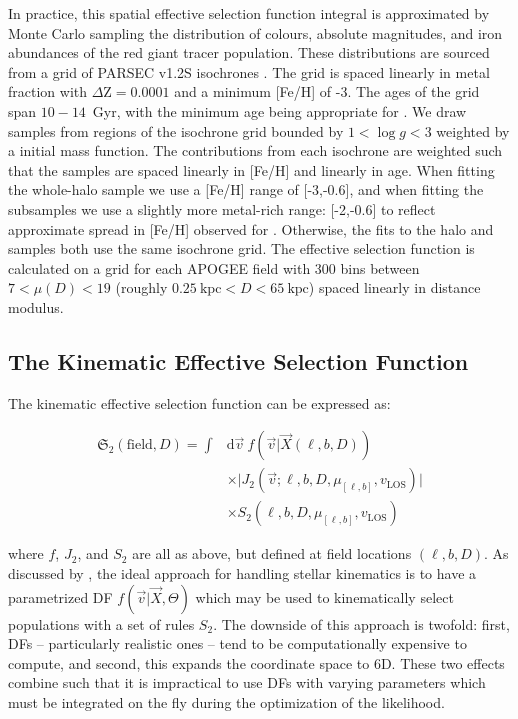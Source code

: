 In practice, this spatial effective selection function integral is approximated by Monte Carlo sampling the distribution of colours, absolute magnitudes, and iron abundances of the red giant tracer population. These distributions are sourced from a grid of PARSEC v1.2S isochrones \parencite{bressan12}. The grid is spaced linearly in metal fraction with $\Delta \mathrm{Z} = 0.0001$ and a minimum [Fe/H] of -3. The ages of the grid span $10-14$~Gyr, with the minimum age being appropriate for \gse \parencite{montalban21}. We draw samples from regions of the isochrone grid bounded by $1 < \log g < 3$ weighted by a \textcite{chabrier03} initial mass function. The contributions from each isochrone are weighted such that the samples are spaced linearly in [Fe/H] and linearly in age. When fitting the whole-halo sample we use a [Fe/H] range of [-3,-0.6], and when fitting the \gse subsamples we use a slightly more metal-rich range: [-2,-0.6] to reflect approximate spread in [Fe/H] observed for \gse \parencite[see our Figure~\ref{fig:selection_abundances} or refer to e.g.][]{myeong19,hasselquist21,horta23a}. Otherwise, the fits to the halo and \gse samples both use the same isochrone grid. The effective selection function is calculated on a grid for each APOGEE field with 300 bins between $7 < \mu(D) < 19$ (roughly $0.25~\mathrm{kpc} < D < 65~\mathrm{kpc}$) spaced linearly in distance modulus.

\subsection{The Kinematic Effective Selection Function}
\label{subsec:kinematic-effective-selection-function}

The kinematic effective selection function can be expressed as:

\begin{equation}
\label{eq:kinematic-effective-selection-function}
\begin{split}
    \mathfrak{S}_{2}(\mathrm{field},D) = \int & \mathrm{d} \vec{v}\ f(\vec{v} \vert \vec{X}(\ell, b, D)) \\
    & \times \lvert J_{2}(\vec{v}; \ell, b, D, \mu_{[\ell,b]}, v_{\mathrm{LOS}}) \rvert \\
    & \times S_{2}(\ell, b, D, \mu_{[\ell,b]}, v_{\mathrm{LOS}})
\end{split}
\end{equation}

where $f$, $J_{2}$, and $S_{2}$ are all as above, but defined at field locations $(\ell,b,D)$. As discussed by \cite{mackereth20}, the ideal approach for handling stellar kinematics is to have a parametrized DF $f(\vec{v} \vert \vec{X}, \Theta)$ which may be used to kinematically select populations with a set of rules $S_{2}$. The downside of this approach is twofold: first, DFs -- particularly realistic ones -- tend to be computationally expensive to compute, and second, this expands the coordinate space to 6D. These two effects combine such that it is impractical to use DFs with varying parameters which must be integrated on the fly during the optimization of the likelihood.

